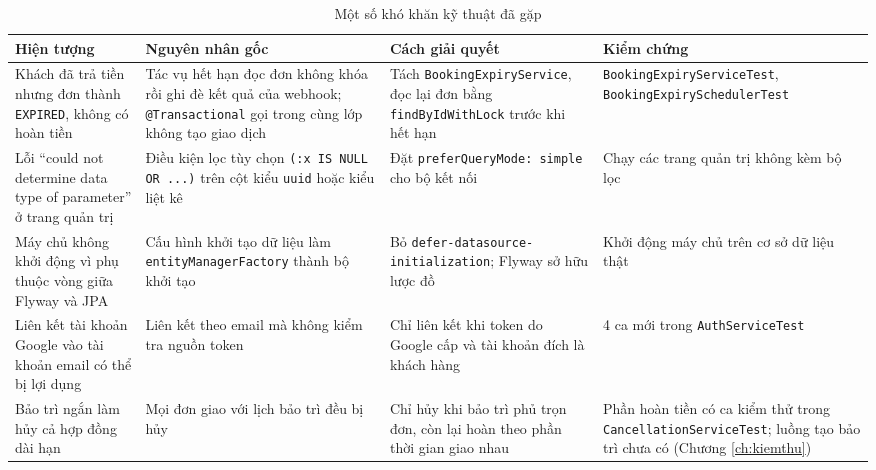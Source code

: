 \begin{table}[H]
\centering
\caption{Một số khó khăn kỹ thuật đã gặp}
\label{tab:ht_khokhan}
\small
\renewcommand{\arraystretch}{1.25}
\begin{tabular}{|p{2.8cm}|p{3.9cm}|p{3.6cm}|p{3.5cm}|}
\hline
\textbf{Hiện tượng} & \textbf{Nguyên nhân gốc} & \textbf{Cách giải quyết} & \textbf{Kiểm chứng} \\
\hline
Khách đã trả tiền nhưng đơn thành \texttt{EXPIRED}, không có hoàn tiền & Tác vụ hết hạn đọc đơn không khóa rồi ghi đè kết quả của webhook; \texttt{@Transactional} gọi trong cùng lớp không tạo giao dịch & Tách \texttt{BookingExpiryService}, đọc lại đơn bằng \texttt{findByIdWithLock} trước khi hết hạn & \texttt{BookingExpiry\allowbreak ServiceTest}, \texttt{BookingExpiry\allowbreak SchedulerTest} \\
\hline
Lỗi ``could not determine data type of parameter'' ở trang quản trị & Điều kiện lọc tùy chọn \texttt{(:x IS NULL OR ...)} trên cột kiểu \texttt{uuid} hoặc kiểu liệt kê & Đặt \texttt{preferQuery\allowbreak Mode: simple} cho bộ kết nối & Chạy các trang quản trị không kèm bộ lọc \\
\hline
Máy chủ không khởi động vì phụ thuộc vòng giữa Flyway và JPA & Cấu hình khởi tạo dữ liệu làm \texttt{entityManagerFactory} thành bộ khởi tạo & Bỏ \texttt{defer-\allowbreak datasource-\allowbreak initialization}; Flyway sở hữu lược đồ & Khởi động máy chủ trên cơ sở dữ liệu thật \\
\hline
Liên kết tài khoản Google vào tài khoản email có thể bị lợi dụng & Liên kết theo email mà không kiểm tra nguồn token & Chỉ liên kết khi token do Google cấp và tài khoản đích là khách hàng & 4 ca mới trong \texttt{AuthServiceTest} \\
\hline
Bảo trì ngắn làm hủy cả hợp đồng dài hạn & Mọi đơn giao với lịch bảo trì đều bị hủy & Chỉ hủy khi bảo trì phủ trọn đơn, còn lại hoàn theo phần thời gian giao nhau & Phần hoàn tiền có ca kiểm thử trong \texttt{Cancellation\allowbreak ServiceTest}; luồng tạo bảo trì chưa có (Chương \ref{ch:kiemthu}) \\
\hline
\end{tabular}
\end{table}
